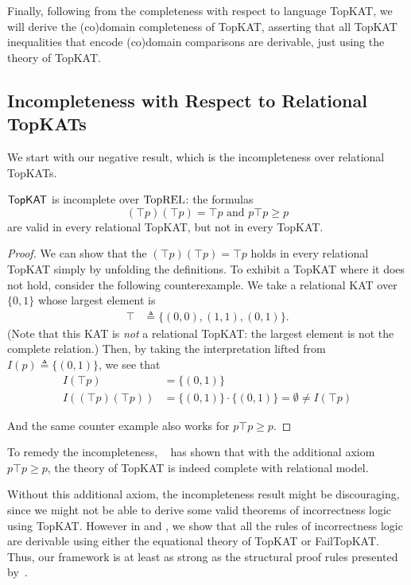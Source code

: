 Finally, following from the completeness with respect to language TopKAT, we will derive the (co)domain completeness of TopKAT, asserting that all TopKAT inequalities that encode (co)domain comparisons are derivable, just using the theory of TopKAT.


\subsection{Incompleteness with Respect to Relational TopKATs}

We start with our negative result, which is the incompleteness over relational TopKATs.

\begin{theorem}\label{the: topkatstar incomplete over relational model}
  \(\mathsf{TopKAT}\) is incomplete over \(\mathbf{\mathrm{TopREL}}\): the formulas
  \[(⊤ p) (⊤ p) = ⊤ p \text{ and } p ⊤ p ≥ p\] 
  are valid in every relational TopKAT, but not in every TopKAT\@.
\end{theorem}

\begin{proof}
  We can show that the \((⊤ p) (⊤ p) = ⊤ p\) 
  holds in every relational TopKAT simply by
  unfolding the definitions.  To exhibit a TopKAT where it does not hold,
  consider the following counterexample.  We take a relational KAT over
  \(\{0,1\}\) whose largest element is
  \begin{align*}
    ⊤ & ≜ \{(0,0), (1,1), (0,1)\}.
  \end{align*}
  (Note that this KAT is \emph{not} a relational TopKAT\@: the largest
  element is not the complete relation.)
  Then, by taking the interpretation lifted from \(I(p) ≜\{(0, 1)\}\), we see that
  \begin{align*}
    I(⊤ p) & = \{(0, 1)\} \\
    I((⊤ p) (⊤ p)) & 
        = \{(0, 1)\} ⋅ \{(0, 1)\} 
        = ∅ ≠ I(⊤ p)
  \end{align*}

  And the same counter example also works for 
  \(p ⊤ p ≥ p\).
\end{proof}

To remedy the incompleteness, \citeauthor{Pous_Wagemaker_2022}~\cite{Pous_Wagemaker_2023,Pous_Wagemaker_2022} has shown that with the additional axiom \(p ⊤ p ≥ p\), the theory of TopKAT is indeed complete with relational model.

Without this additional axiom, the incompleteness result might be discouraging, since we might not be able to derive some valid theorems of incorrectness logic using TopKAT. However in  and , we show that all the rules of incorrectness logic are derivable using either the equational theory of TopKAT or FailTopKAT\@.  Thus,
our framework is at least as strong as the structural proof rules presented by~\citet{OHearn_2020}.

